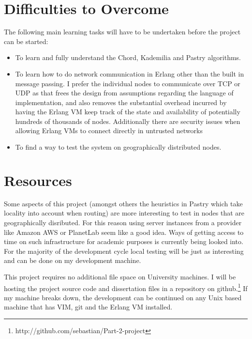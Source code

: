 \section*{Difficulties to Overcome}

The following main learning tasks will have to be undertaken before 
the project can be started:

\begin{itemize}

\item To learn and fully understand the Chord, Kademilia and Pastry algorithms.

\item To learn how to do network communication in Erlang other than the built in message passing. I prefer the individual nodes to communicate over TCP or UDP as that frees the design from assumptions regarding the language of implementation, and also removes the substantial overhead incurred by having the Erlang VM keep track of the state and availability of potentially hundreds of thousands of nodes. Additionally there are security issues when allowing Erlang VMs to connect directly in untrusted networks

\item To find a way to test the system on geographically distributed nodes.

\end{itemize}


\section*{Resources}

Some aspects of this project (amongst others the heuristics in Pastry which take locality into account when routing) are more interesting to test in nodes that are geographically disributed. For this reason using server instances from a provider like Amazon AWS or PlanetLab seem like a good idea. Ways of getting access to time on such infrastructure for academic purposes is currently being looked into. For the majority of the development cycle local testing will be just as interesting and can be done on my development machine.

This project requires no additional file space on University machines. I will be hosting the project source code and dissertation files in a repository on github.\footnote{http://github.com/sebastian/Part-2-project}
If my machine breaks down, the development can be continued on any Unix based machine that has VIM, git and the Erlang VM installed.

